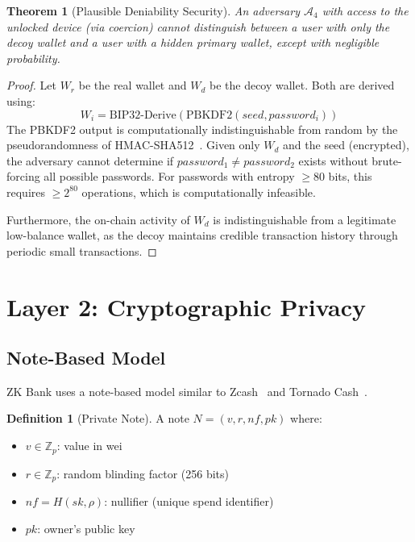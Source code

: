 \documentclass[11pt]{article}
\theoremstyle{definition}
\newtheorem{definition}{Definition}[section]
\theoremstyle{plain}
\newtheorem{theorem}{Theorem}[section]
\theoremstyle{remark}
\begin{document}
\begin{theorem}[Plausible Deniability Security]
\label{thm:deniability}
An adversary $\mathcal{A}_4$ with access to the unlocked device (via coercion) cannot distinguish between a user with only the decoy wallet and a user with a hidden primary wallet, except with negligible probability.
\end{theorem}

\begin{proof}
Let $W_r$ be the real wallet and $W_d$ be the decoy wallet. Both are derived using:
\begin{equation}
W_i = \text{BIP32-Derive}(\text{PBKDF2}(seed, password_i))
\end{equation}
The PBKDF2 output is computationally indistinguishable from random by the pseudorandomness of HMAC-SHA512~\cite{krawczyk2010hmac}. Given only $W_d$ and the seed (encrypted), the adversary cannot determine if $password_1 \neq password_2$ exists without brute-forcing all possible passwords. For passwords with entropy $\geq 80$ bits, this requires $\geq 2^{80}$ operations, which is computationally infeasible.

Furthermore, the on-chain activity of $W_d$ is indistinguishable from a legitimate low-balance wallet, as the decoy maintains credible transaction history through periodic small transactions.
\end{proof}

\section{Layer 2: Cryptographic Privacy}
\label{sec:layer2}

\subsection{Note-Based Model}

ZK Bank uses a note-based model similar to Zcash~\cite{hopwood2016zcash} and Tornado Cash~\cite{pertsev2019tornado}.

\begin{definition}[Private Note]
A note $N = (v, r, nf, pk)$ where:
\begin{itemize}
    \item $v \in \mathbb{Z}_p$: value in wei
    \item $r \in \mathbb{Z}_p$: random blinding factor (256 bits)
    \item $nf = H(sk, \rho)$: nullifier (unique spend identifier)
    \item $pk$: owner's public key
\end{itemize}
\end{definition}
\end{document}
